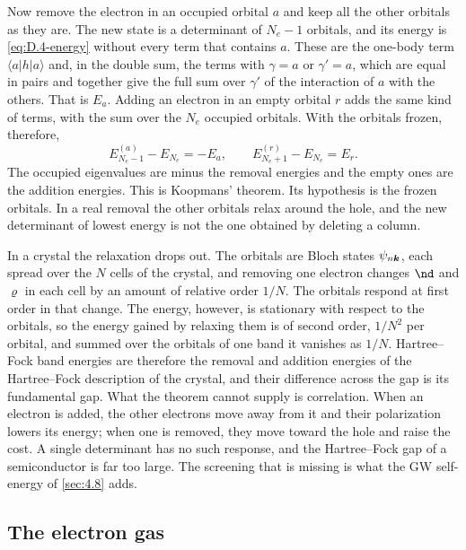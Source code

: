 Now remove the electron in an occupied orbital $a$ and keep all the other orbitals as they are. The new state is a determinant of $N_e - 1$ orbitals, and its energy is \cref{eq:D.4-energy} without every term that contains $a$. These are the one-body term $\langle a|h|a\rangle$ and, in the double sum, the terms with $\gamma = a$ or $\gamma' = a$, which are equal in pairs and together give the full sum over $\gamma'$ of the interaction of $a$ with the others. That is $E_a$. Adding an electron in an empty orbital $r$ adds the same kind of terms, with the sum over the $N_e$ occupied orbitals. With the orbitals frozen, therefore,
\begin{equation}
  E_{N_e-1}^{(a)} - E_{N_e} = -E_a, \qquad E_{N_e+1}^{(r)} - E_{N_e} = E_r .
  \label{eq:D.4-koopmans}
\end{equation}
The occupied eigenvalues are minus the removal energies and the empty ones are the addition energies. This is Koopmans' theorem. Its hypothesis is the frozen orbitals. In a real removal the other orbitals relax around the hole, and the new determinant of lowest energy is not the one obtained by deleting a column.

In a crystal the relaxation drops out. The orbitals are Bloch states $\psi_{n\bm{k}}$, each spread over the $N$ cells of the crystal, and removing one electron changes $\nd$ and $\varrho$ in each cell by an amount of relative order $1/N$. The orbitals respond at first order in that change. The energy, however, is stationary with respect to the orbitals, so the energy gained by relaxing them is of second order, $1/N^2$ per orbital, and summed over the orbitals of one band it vanishes as $1/N$. Hartree--Fock band energies are therefore the removal and addition energies of the Hartree--Fock description of the crystal, and their difference across the gap is its fundamental gap. What the theorem cannot supply is correlation. When an electron is added, the other electrons move away from it and their polarization lowers its energy; when one is removed, they move toward the hole and raise the cost. A single determinant has no such response, and the Hartree--Fock gap of a semiconductor is far too large. The screening that is missing is what the GW self-energy of \cref{sec:4.8} adds.

\subsection*{The electron gas}

